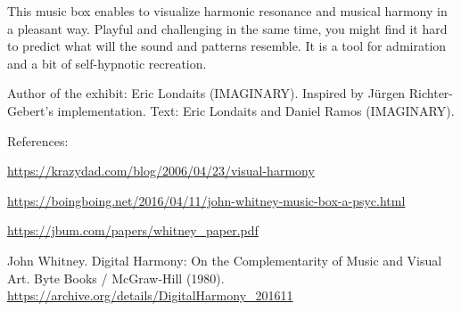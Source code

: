 This music box enables to visualize harmonic resonance and musical harmony in a pleasant way. Playful and challenging in the same time, you might find it hard to predict what will the sound and patterns resemble. It is a tool for admiration and a bit of self-hypnotic recreation.



\vfill

Author of the exhibit: Eric Londaits (IMAGINARY). 
Inspired by Jürgen Richter-Gebert's implementation.
Text: Eric Londaits and Daniel Ramos (IMAGINARY).

References:

\url{https://krazydad.com/blog/2006/04/23/visual-harmony}

\url{https://boingboing.net/2016/04/11/john-whitney-music-box-a-psyc.html}

\url{https://jbum.com/papers/whitney_paper.pdf}

John Whitney. Digital Harmony: On the Complementarity of Music and Visual Art. Byte Books / McGraw-Hill (1980). \url{https://archive.org/details/DigitalHarmony_201611}

